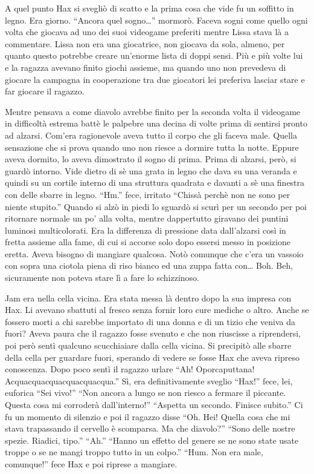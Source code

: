     A quel punto Hax si svegliò di scatto e la prima cosa che vide fu un soffitto in legno. Era
    giorno. ``Ancora quel sogno\dots{}'' mormorò. Faceva sogni come quello
    ogni volta che giocava ad uno dei suoi videogame preferiti mentre Lissa
    stava là a commentare. Lissa non era una giocatrice, non giocava da
    sola, almeno, per quanto questo potrebbe creare un'enorme lista di
    doppi sensi. Più e più volte lui e la ragazza avevano finito giochi
    assieme, ma quando uno non prevedeva di giocare la campagna in
    cooperazione tra due giocatori lei preferiva lasciar stare e far
    giocare il ragazzo.
    
    Mentre pensava a come diavolo avrebbe finito per la seconda volta il
    videogame in difficoltà estrema battè le palpebre una decina di volte prima di sentirsi pronto
    ad alzarsi. Com'era ragionevole aveva tutto il corpo che gli faceva
    male. Quella sensazione che si prova quando uno non riesce a dormire
    tutta la notte. Eppure aveva dormito, lo aveva dimostrato il sogno di
    prima. Prima di alzarsi, però, si guardò intorno. Vide dietro di sè una grata in
    legno che dava su una veranda e quindi su un cortile interno di una
    struttura quadrata e davanti a sè una finestra con delle sbarre in
    legno. ``Hm.'' fece, irritato ``Chissà perchè non ne sono per niente
    stupito.'' Quando si alzò in piedi lo sguardò si scurì per un secondo
    per poi ritornare normale un po' alla volta, mentre dappertutto
    giravano dei puntini luminosi multicolorati. Era la differenza di
    pressione data dall'alzarsi così in fretta assieme alla fame, di cui si
    accorse solo dopo essersi messo in posizione eretta. Aveva bisogno di
    mangiare qualcosa. Notò comunque che c'era un vassoio con sopra una
    ciotola piena di riso bianco ed una zuppa fatta con\dots{} Boh. Beh,
    sicuramente non poteva stare lì a fare lo schizzinoso.

    Jam era nella cella vicina. Era stata messa là dentro dopo la sua
    impresa con Hax. Li avevano sbattuti al fresco senza fornir loro cure
    mediche o altro. Anche se fossero morti a chi sarebbe importato di una
    donna e di un tizio che veniva da fuori? Aveva paura che il ragazzo
    fosse svenuto e che non riuscisse a riprendersi, poi però sentì
    qualcuno scucchiaiare dalla cella vicina. Si precipitò alle sbarre
    della cella per guardare fuori, sperando di vedere se fosse Hax che
    aveva ripreso conoscenza. Dopo poco sentì il ragazzo urlare ``Ah!
    Oporcaputtana! Acquacquacquacquacquacqua.'' Sì, era definitivamente
    sveglio ``Hax!'' fece, lei, euforica ``Sei vivo!'' ``Non ancora a lungo
    se non riesco a fermare il piccante. Questa cosa mi corroderà
    dall'interno!'' ``Aspetta un secondo. Finisce subito.'' Ci fu un
    momento di silenzio e poi il ragazzo disse ``Oh. Hei! Quella cosa che
    mi stava trapassando il cervello è scomparsa. Ma che diavolo?'' ``Sono
    delle nostre spezie. Riadici, tipo.'' ``Ah.'' ``Hanno un effetto del
    genere se ne sono state usate troppe o se ne mangi troppo
    tutto in un colpo.'' ``Hum. Non era male, comunque!'' fece Hax e poi
    riprese a mangiare.

